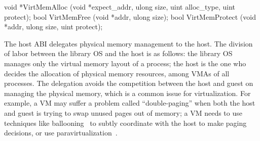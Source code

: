 \begin{paldef}
void *VirtMemAlloc   (void *expect_addr, ulong size,
                      uint alloc_type, uint protect);
bool  VirtMemFree    (void *addr, ulong size);
bool  VirtMemProtect (void *addr, ulong size,
                      uint protect);
\end{paldef}


The host ABI delegates physical memory management to the host. The division of labor between the library OS and the host is as follows:
the library OS manages only the virtual memory layout of a process;
the host is the one who decides the allocation of physical memory resources, among VMAs of all processes.
The delegation avoids the competition between the host and guest
on managing the physical memory, which is a common issue for virtualization.
For example, a VM may suffer a problem called ``double-paging'' when both the host and guest is trying to swap unused pages out of memory; a VM needs to use techniques like ballooning~\cite{wldspurger02vmware-esx} to subtly coordinate with the host to make paging decisions,
or use paravirtualization~\cite{vmware_vmi}.







